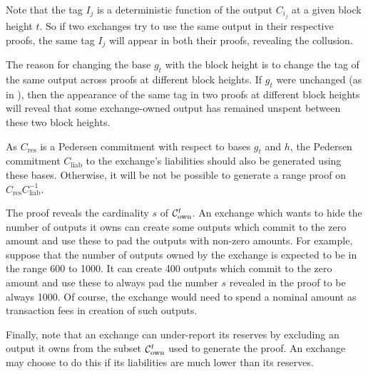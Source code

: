 Note that the tag $I_j$ is a deterministic function of the output $C_{i_j}$ at a given block height $t$. So if two exchanges try to use the same output in their respective \RPlus proofs, the same tag $I_j$ will appear in both their proofs, revealing the collusion.

The reason for changing the base $g_t$ with the block height is to change the tag of the same output across \RPlus proofs at different block heights. If $g_t$ were unchanged (as in \R \cite{Dutta2019b}), then the appearance of the same tag in two \RPlus proofs at different block heights will reveal that some exchange-owned output has remained unspent between these two block heights.

As $C_\text{res}$ is a Pedersen commitment with respect to bases $g_t$ and $h$, the Pedersen commitment $C_{\text{liab}}$ to the exchange's liabilities should also be generated using these bases. Otherwise, it will be not be possible to generate a range proof on $C_{\text{res}}C_{\text{liab}}^{-1}$.

The proof reveals the cardinality $s$ of $\mathcal{C}_{\text{own}}^t$. 
An exchange which wants to hide the number of outputs it owns can create some outputs which commit to the zero amount and use these to pad the outputs with non-zero amounts.
For example, suppose that the number of outputs owned by the exchange is expected to be in the range 600 to 1000. It can create 400 outputs which commit to the zero amount and use these to always pad the number $s$ revealed in the proof to be always 1000.
Of course, the exchange would need to spend a nominal amount as transaction fees in creation of such outputs.

Finally, note that an exchange can under-report its reserves by excluding an output it owns from the subset $\mathcal{C}_{\text{own}}^t$ used to generate the \RPlus proof. An exchange may choose to do this if its liabilities are much lower than its reserves.

